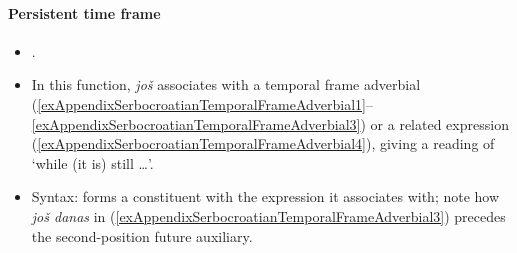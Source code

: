 \paragraph{Persistent time frame}
\label{appendixBCMSContinuativeTT}
\begin{itemize}
	\item \textcite{Buchholz1991}.
	\item In this function, \textit{još} associates with a temporal frame adverbial (\ref{exAppendixSerbocroatianTemporalFrameAdverbial1}– \ref{exAppendixSerbocroatianTemporalFrameAdverbial3})	 or a related expression (\ref{exAppendixSerbocroatianTemporalFrameAdverbial4}), giving a reading of \lq while (it is) still …'.
	\item Syntax: forms a constituent with the expression it associates with; note how
\textit{još danas} in (\ref{exAppendixSerbocroatianTemporalFrameAdverbial3}) precedes the second-position future auxiliary.
\end{itemize}

